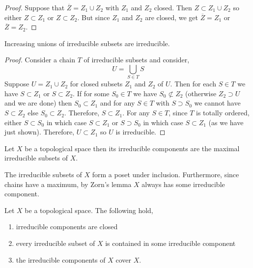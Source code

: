 \documentclass[12pt]{article}
\begin{document}
\begin{proof}
Suppose that $\overline{Z} = Z_1 \cup Z_2$ with $Z_1$ and $Z_2$ closed. Then $Z \subset Z_1 \cup Z_2$ so either $Z \subset Z_1$ or $Z \subset Z_2$. But since $Z_1$ and $Z_2$ are closed, we get $\overline{Z} = Z_1$ or $\overline{Z} = Z_2$. 
\end{proof}

\begin{lemma}
Increasing unions of irreducible subsets are irreducible.
\end{lemma}

\begin{proof}
Consider a chain $T$ of irreducible subsets and consider,
\[ U = \bigcup_{S \in T} S \]
Suppose $U = Z_1 \cup Z_2$ for closed subsets $Z_1$ and $Z_2$ of $U$. Then for each $S \in T$ we have $S \subset Z_1$ or $S \subset Z_2$. If for some $S_0 \in T$ we have $S_0 \not\subset Z_2$ (otherwise $Z_2 \supset U$ and we are done) then $S_0 \subset Z_1$ and for any $S \in T$ with $S \supset S_0$ we cannot have $S \subset Z_2$ else $S_0 \subset Z_2$. Therefore, $S \subset Z_1$. For any $S \in T$, since $T$ is totally ordered, either $S \subset S_0$ in which case $S \subset Z_1$ or $S \supset S_0$ in which case $S \subset Z_1$ (as we have just shown). Therefore, $U \subset Z_1$ so $U$ is irreducible.
\end{proof}

\begin{defn}
Let $X$ be a topological space then its irreducible components are the maximal irreducible subsets of $X$.
\end{defn}

\begin{rmk}
The irreducible subsets of $X$ form a poset under inclusion. Furthermore, since chains have a maximum, by Zorn's lemma $X$ always has some irreducible component.  
\end{rmk}

\begin{lemma}
Let $X$ be a topological space. The following hold,
\begin{enumerate}
\item irreducible components are closed
\item every irreducible subset of $X$ is contained in some irreducible component
\item the irreducible components of $X$ cover $X$.
\end{enumerate}
\end{lemma}
\end{document}
